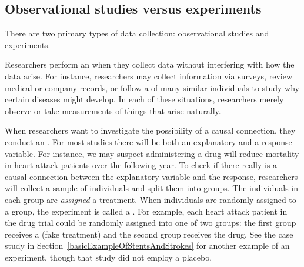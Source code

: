 
\subsection{Observational studies versus experiments}

There are two primary types of data collection: observational studies and experiments.

Researchers perform an  when they collect data without interfering with how the data arise.  For instance, researchers may collect information via surveys, review medical or company records, or follow a  of many similar individuals to study why certain diseases might develop.  In each of these situations, researchers merely observe or take measurements of things that arise naturally.  

When researchers want to investigate the possibility of a causal connection, they conduct an .   For most studies there will be both an explanatory and a response variable. For instance, we may suspect administering a drug will reduce mortality in heart attack patients over the following year. To check if there really is a causal connection between the explanatory variable and the response, researchers will collect a sample of individuals and split them into groups. The individuals in each group are \emph{assigned} a treatment. When individuals are randomly assigned to a group, the experiment is called a . For example, each heart attack patient in the drug trial could be randomly assigned into one of two groups: the first group receives a  (fake treatment) and the second group receives the drug. See the case study in Section~\ref{basicExampleOfStentsAndStrokes} for another example of an experiment, though that study did not employ a placebo.

